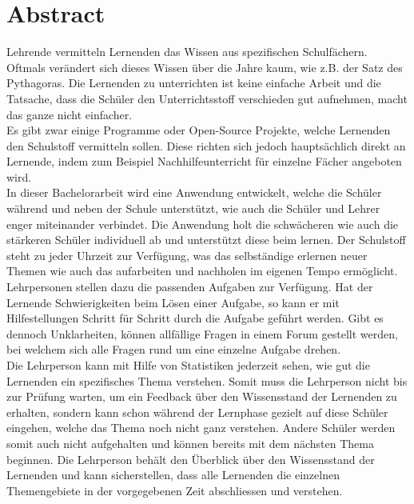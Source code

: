 \afterpage{\blankpage}
\section*{Abstract}

Lehrende vermitteln Lernenden das Wissen aus spezifischen Schulfächern. Oftmals verändert sich dieses Wissen über die Jahre kaum, wie z.B. der Satz des Pythagoras. Die Lernenden zu unterrichten ist keine einfache Arbeit und die Tatsache, dass die Schüler den Unterrichtsstoff verschieden gut aufnehmen, macht das ganze nicht einfacher. \\

Es gibt zwar einige Programme oder Open-Source Projekte, welche Lernenden den Schulstoff vermitteln sollen. Diese richten sich jedoch hauptsächlich direkt an Lernende, indem zum Beispiel Nachhilfeunterricht für einzelne Fächer angeboten wird.\\

In dieser Bachelorarbeit wird eine Anwendung entwickelt, welche die Schüler während und neben der Schule unterstützt, wie auch die Schüler und Lehrer enger miteinander verbindet. Die Anwendung holt die schwächeren wie auch die stärkeren Schüler individuell ab und unterstützt diese beim lernen. Der Schulstoff steht zu jeder Uhrzeit zur Verfügung, was das selbständige erlernen neuer Themen wie auch das aufarbeiten und nachholen im eigenen Tempo ermöglicht. Lehrpersonen stellen dazu die passenden Aufgaben zur Verfügung. Hat der Lernende Schwierigkeiten beim Lösen einer Aufgabe, so kann er mit Hilfestellungen Schritt für Schritt durch die Aufgabe geführt werden. Gibt es dennoch Unklarheiten, können allfällige Fragen in einem Forum gestellt werden, bei welchem sich alle Fragen rund um eine einzelne Aufgabe drehen. \\

Die Lehrperson kann mit Hilfe von Statistiken jederzeit sehen, wie gut die Lernenden ein spezifisches Thema verstehen. Somit muss die Lehrperson nicht bis zur Prüfung warten, um ein Feedback über den Wissensstand der Lernenden zu erhalten, sondern kann schon während der Lernphase gezielt auf diese Schüler eingehen, welche das Thema noch nicht ganz verstehen. Andere Schüler werden somit auch nicht aufgehalten und können bereits mit dem nächsten Thema beginnen. Die Lehrperson behält den Überblick über den Wissensstand der Lernenden und kann sicherstellen, dass alle Lernenden die einzelnen Themengebiete in der vorgegebenen Zeit abschliessen und verstehen.


\newpage